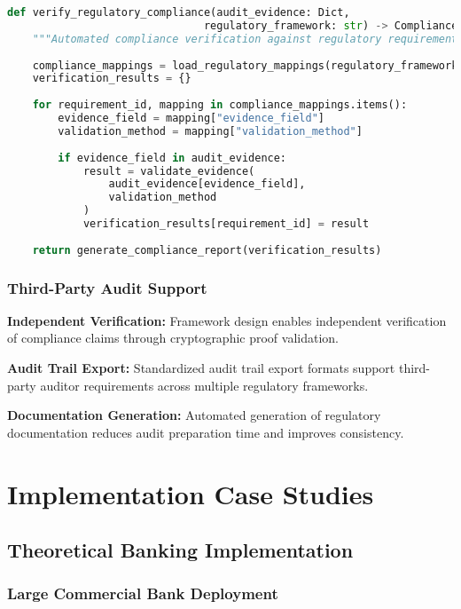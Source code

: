\documentclass[12pt,a4paper]{article}
\begin{document}
\begin{lstlisting}[language=Python, caption=Automated Compliance Verification]
def verify_regulatory_compliance(audit_evidence: Dict, 
                               regulatory_framework: str) -> ComplianceReport:
    """Automated compliance verification against regulatory requirements"""
    
    compliance_mappings = load_regulatory_mappings(regulatory_framework)
    verification_results = {}
    
    for requirement_id, mapping in compliance_mappings.items():
        evidence_field = mapping["evidence_field"]
        validation_method = mapping["validation_method"]
        
        if evidence_field in audit_evidence:
            result = validate_evidence(
                audit_evidence[evidence_field], 
                validation_method
            )
            verification_results[requirement_id] = result
    
    return generate_compliance_report(verification_results)
\end{lstlisting}

\subsubsection{Third-Party Audit Support}

\textbf{Independent Verification:} Framework design enables independent verification of compliance claims through cryptographic proof validation.

\textbf{Audit Trail Export:} Standardized audit trail export formats support third-party auditor requirements across multiple regulatory frameworks.

\textbf{Documentation Generation:} Automated generation of regulatory documentation reduces audit preparation time and improves consistency.

\section{Implementation Case Studies}

\subsection{Theoretical Banking Implementation}

\subsubsection{Large Commercial Bank Deployment}
\end{document}
